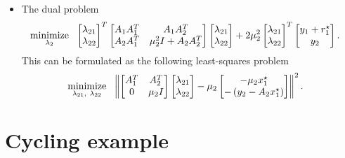 \documentclass[12pt]{article}
\begin{document}
\begin{itemize}
\item The dual problem
%
\begin{align*}
\mathop{\mbox{minimize}}_{\lambda_{2}} \ \  &
\begin{bmatrix} \lambda_{21} \\ \lambda_{22} \end{bmatrix}^T
\begin{bmatrix} A_1A_1^T & A_1A_2^T \\ A_2A_1^T & \mu_2^2 I+A_2A_2^T \end{bmatrix}
\begin{bmatrix} \lambda_{21} \\ \lambda_{22} \end{bmatrix} +
2\mu_2^2
\begin{bmatrix} \lambda_{21} \\ \lambda_{22} \end{bmatrix}^T \begin{bmatrix} y_1+r_1^{\star} \\ y_2 \end{bmatrix}.
\end{align*}
%
This can be formulated as the following least-squares problem
%
\begin{align*}
  \mathop{\mbox{minimize}}_{\lambda_{21},\ \lambda_{22}} \ \  & \left\lVert\begin{bmatrix}A_1^T & A_2^T \\ 0 & \mu_2I \end{bmatrix}
    \begin{bmatrix} \lambda_{21} \\ \lambda_{22} \end{bmatrix} -
    \mu_2\begin{bmatrix} -\mu_2 x_1^{\star} \\ -\left(y_2 - A_2x_1^{\star}\right) \end{bmatrix}\right\rVert^2.
\end{align*}

\end{itemize}

\section{Cycling example} \label{seq.Cycling}
\end{document}
